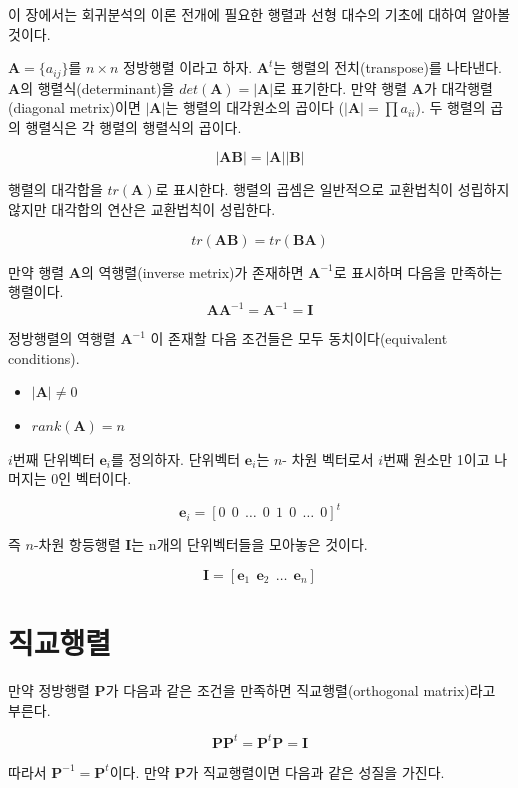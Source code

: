 \documentclass[
  10pt,
]{book}
\providecommand{\tightlist}{%
  \setlength{\itemsep}{0pt}\setlength{\parskip}{0pt}}
\theoremstyle{definition}
\theoremstyle{definition}
\theoremstyle{definition}
\theoremstyle{definition}
\theoremstyle{remark}
\begin{document}
이 장에서는 회귀분석의 이론 전개에 필요한 행렬과 선형 대수의 기초에 대하여 알아볼 것이다.

\(\bm A = \{ a_{ij} \}\)를 \(n \times n\) 정방행렬 이라고 하자. \(\bm A^t\)는 행렬의 전치(transpose)를 나타낸다. \(\bm A\)의 행렬식(determinant)을 \(det(\bm A)=|\bm A|\)로 표기한다. 만약 행렬 \(\bm A\)가 대각행렬(diagonal metrix)이면 \(|\bm A|\)는 행렬의 대각원소의 곱이다 (\(| \bm A| =\prod a_{ii}\)). 두 행렬의 곱의 행렬식은 각 행렬의 행렬식의 곱이다.

\[ |\bm A \bm B | = | \bm A| |\bm B| \]

행렬의 대각합을 \(tr(\bm A)\)로 표시한다. 행렬의 곱셈은 일반적으로 교환법칙이 성립하지 않지만 대각합의 연산은 교환법칙이 성립한다.

\[  tr(\bm A \bm B)  = tr( \bm B \bm A) \]

만약 행렬 \(\bm A\)의 역행렬(inverse metrix)가 존재하면 \(\bm A^{-1}\)로 표시하며 다음을 만족하는 행렬이다.
\[ \bm A \bm A^{-1} = \bm A^{-1} = \bm I \]

정방행렬의 역행렬 \(\bm A^{-1}\) 이 존재할 다음 조건들은 모두 동치이다(equivalent conditions).

\begin{itemize}
\tightlist
\item
  \(|\bm A| \ne 0\)
\item
  \(rank(\bm A) = n\)
\end{itemize}

\(i\)번째 단위벡터 \(\bm e_i\)를 정의하자. 단위벡터 \(\bm e_i\)는 \(n\)- 차원 벡터로서 \(i\)번째 원소만 1이고 나머지는 0인 벡터이다.

\[ \bm e_i = [0 ~~0 ~~\dots~~ 0 ~~ 1 ~~ 0 ~~ \dots ~~ 0 ]^t \]

즉 \(n\)-차원 항등행렬 \(\bm I\)는 n개의 단위벡터들을 모아놓은 것이다.

\[  \bm I = [ \bm e_1 ~~ \bm e_2 ~~ \dots ~~ \bm e_n ] \]

\hypertarget{uxc9c1uxad50uxd589uxb82c}{%
\section{직교행렬}\label{uxc9c1uxad50uxd589uxb82c}}

만약 정방행렬 \(\bm P\)가 다음과 같은 조건을 만족하면 직교행렬(orthogonal matrix)라고 부른다.

\[  \bm P \bm P^t = \bm P^t \bm P = \bm I \]

따라서 \(\bm P^{-1} = \bm P^t\)이다. 만약 \(\bm P\)가 직교행렬이면 다음과 같은 성질을 가진다.
\end{document}
